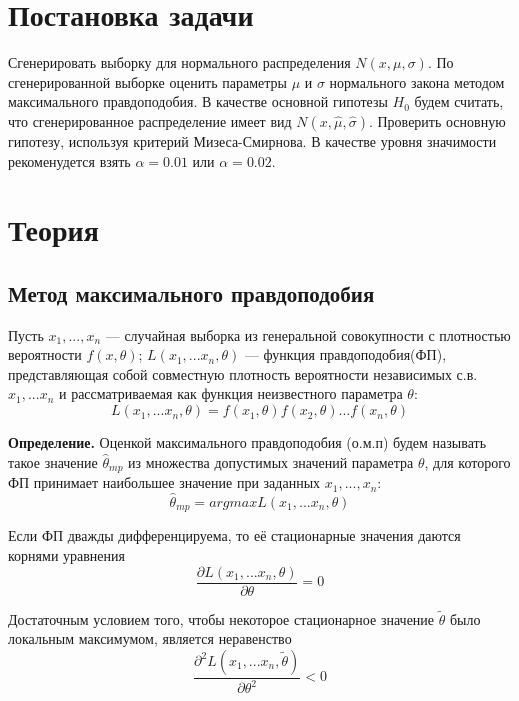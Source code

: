 \newpage
\listoftables


\newpage
\section{Постановка задачи}
Сгенерировать выборку для нормального распределения $N(x, \mu, \sigma)$.
По сгенерированной выборке оценить параметры $\mu$ и $\sigma$ нормального закона методом максимального правдоподобия. В качестве основной гипотезы $H_0$ будем считать, что сгенерированное распределение имеет вид $N(x, \hat{\mu}, \hat{\sigma})$. Проверить основную гипотезу, используя критерий Мизеса-Смирнова. В качестве уровня значимости рекоменудется взять $\alpha = 0.01$ или $\alpha = 0.02$.

\section{Теория}
\subsection{Метод максимального правдоподобия}

Пусть $x_1, ... , x_n$ — случайная выборка из генеральной совокупности с плотностью вероятности $f(x,  \theta)$; $L(x_1, ... x_n, \theta)$ — функция правдоподобия(ФП), представляющая собой совместную плотность вероятности независимых с.в. $x_1, ... x_n$ и рассматриваемая как функция неизвестного параметра $\theta$:
\begin{equation} \label{eq:Lfirst}
L(x_1, ... x_n, \theta) = f(x_1,  \theta) f(x_2,  \theta) ... f(x_n,  \theta)
\end{equation}

\textbf{Определение.} Оценкой максимального правдоподобия (о.м.п) будем называть такое значение $\hat{\theta}_{mp}$ из множества допустимых значений параметра $\theta$, для которого ФП принимает наибольшее значение при заданных $x_1, ... , x_n$:
\begin{equation} \label{eq:omega}
  \hat{\theta}_{mp} = arg max L(x_1, ... x_n, \theta)
\end{equation}

Если ФП дважды дифференцируема, то её стационарные значения даются корнями уравнения
\begin{equation} \label{eq:K}
  \frac{\partial L(x_1, ... x_n, \theta)}{\partial \theta} = 0
\end{equation}

Достаточным условием того, чтобы некоторое стационарное значение $\widetilde{\theta}$ было локальным максимумом, является неравенство
\begin{equation} \label{eq:K}
  \frac{\partial^2 L(x_1, ... x_n, \widetilde{\theta})}{\partial \theta^2} < 0
\end{equation}

